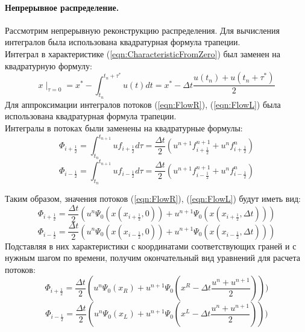 \documentclass[12pt,a4paper]{article}
\begin{document}
\paragraph{Непрерывное распределение.}
Рассмотрим непрерывную реконструкцию распределения. Для вычисления интегралов была использована квадратурная формула трапеции.\\
Интеграл в характеристике (\ref{eqn:CharacteristicFromZero}) был заменен на квадратурную формулу:
\begin{equation}
\label{eqn:CharacteristicQuadr}
x\mid_{\tau=0}=x^*-\int_{t_n}^{t_n+\tau^*}u(t)dt=x^*-\Delta t \frac{u(t_n)+u(t_n+\tau^*)}{2}
\end{equation}
Для аппроксимации интегралов потоков (\ref{eqn:FlowR}), (\ref{eqn:FlowL}) была использована квадратурная формула трапеции.\\
Интегралы в потоках были заменены на квадратурные формулы:
\begin{equation}
\label{eqn:flowRQuadr}
\Phi_{i+\frac{1}{2}}=\int_{t_n}^{t_{n+1}}
{u}f_{i+\frac{1}{2}}d\tau= \frac{\Delta t}{2}(
u^{n+1}f_{i+\frac{1}{2}}^{n+1} +
u^{n}f_{i+\frac{1}{2}}^{n}
)
\end{equation}
\begin{equation}
\label{eqn:flowLQuadr}
\Phi_{i-\frac{1}{2}}=\int_{t_n}^{t_{n+1}}
{u}f_{i-\frac{1}{2}}d\tau= \frac{\Delta t}{2}(
u^{n+1}f_{i-\frac{1}{2}}^{n+1} +
u^{n}f_{i-\frac{1}{2}}^{n}
)
\end{equation}

Таким образом, значения потоков (\ref{eqn:FlowR}), (\ref{eqn:FlowL}) будут иметь вид:
\begin{equation}
\label{eqn:FlowRContPsi}
\Phi_{i+\frac{1}{2}}= \frac{\Delta t}{2}(
u^{n} \Psi_{0}(x(x_{i+\frac{1}{2}}, 0))
+
u^{n+1} \Psi_{0}(x(x_{i+\frac{1}{2}}, \Delta t))
)
\end{equation}
\begin{equation}
\label{eqn:FlowLContPsi}
\Phi_{i-\frac{1}{2}}= \frac{\Delta t}{2}(
u^n \Psi_{0}(x(x_{i-\frac{1}{2}}, 0))
+
u^{n+1} \Psi_{0}(x(x_{i-\frac{1}{2}}, \Delta t))
)
\end{equation}
Подставляя в них характеристики с координатами соответствующих граней и с нужным шагом по времени, получим окончательный вид уравнений для расчета потоков:
\begin{equation}
\label{eqn:FlowRContPsi}
\Phi_{i+\frac{1}{2}}= \frac{\Delta t}{2}(
u^{n} \Psi_{0}(x_R)
+
u^{n+1} \Psi_{0}(x^R-\Delta t \frac{u^n+u^{n+1}}{2}))
)
\end{equation}
\begin{equation}
\label{eqn:FlowLContPsi}
\Phi_{i-\frac{1}{2}}= \frac{\Delta t}{2}(
u^{n} \Psi_{0}(x_L)
+
u^{n+1} \Psi_{0}(x^L-\Delta t \frac{u^n+u^{n+1}}{2}))
)
\end{equation}
\end{document}

